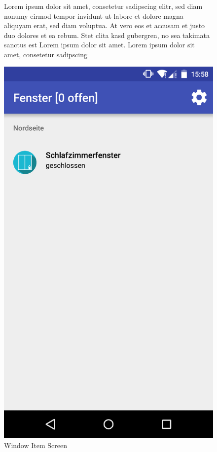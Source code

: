 \begin{figure}[htbp]
	\begin{minipage}{0.6\textwidth} 
Lorem ipsum dolor sit amet, consetetur sadipscing elitr, sed diam nonumy eirmod tempor invidunt ut labore et dolore magna aliquyam erat, sed diam voluptua. At vero eos et accusam et justo duo dolores et ea rebum. Stet clita kasd gubergren, no sea takimata sanctus est Lorem ipsum dolor sit amet. Lorem ipsum dolor sit amet, consetetur sadipscing 
	\end{minipage}
	\hfill
	\begin{minipage}{0.32\textwidth}
		\includegraphics[scale=0.12]{appendix/img/AppScreenshots/Screenshot3}
		\caption{Window Item Screen}
		\label{fig:screenshot_3}
	\end{minipage}
\end{figure}

